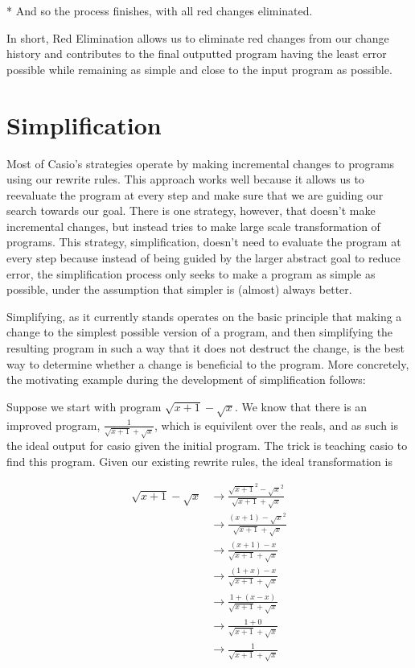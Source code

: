 \documentclass{article}
\newcommand{\sqrsqrt}[1]{\sqrt{#1}^2}
\begin{document}
* And so the process finishes, 
with all red changes eliminated.

In short, 
Red Elimination allows us to eliminate
red changes from our change history 
and contributes to the final outputted 
program having the least error possible 
while remaining as simple 
and close to the input program 
as possible.

\section{Simplification}

Most of Casio's strategies 
operate by making incremental changes 
to programs using our rewrite rules. 
This approach works well 
because it allows us to reevaluate the program 
at every step 
and make sure that we are guiding our search 
towards our goal. 
There is one strategy, however, 
that doesn't make incremental changes, 
but instead tries to make 
large scale transformation of programs. 
This strategy, simplification, 
doesn't need to evaluate 
the program at every step 
because instead of being guided 
by the larger abstract goal 
to reduce error, 
the simplification process only seeks 
to make a program as simple as possible, 
under the assumption that 
simpler is (almost) always better.

Simplifying, 
as it currently stands 
operates on the basic principle 
that making a change to the 
simplest possible version of a program, 
and then simplifying the resulting program 
in such a way that 
it does not destruct the change, 
is the best way to determine 
whether a change is beneficial 
to the program. 
More concretely, 
the motivating example during 
the development of simplification follows:

Suppose we start with program $\sqrt{x+1} - \sqrt{x}$. 
We know that there is an improved program, 
$\frac{1}{\sqrt{x+1} + \sqrt{x}}$, 
which is equivilent over the reals, 
and as such is the ideal output 
for casio given the initial program. 
The trick is teaching casio 
to find this program. 
Given our existing rewrite rules, 
the ideal transformation is 

\begin{align*}
\sqrt{x + 1} - \sqrt{x} &\to \frac{\sqrsqrt{x + 1} - \sqrsqrt{x}}{\sqrt{x + 1} + \sqrt{x}}\\
&\to \frac{(x + 1) - \sqrsqrt{x}}{\sqrt{x + 1} + \sqrt{x}}\\
&\to \frac{(x + 1) - x}{\sqrt{x + 1} + \sqrt{x}}\\
&\to \frac{(1 + x) - x}{\sqrt{x + 1} + \sqrt{x}}\\
&\to \frac{1 + (x - x)}{\sqrt{x + 1} + \sqrt{x}}\\
&\to \frac{1 + 0}{\sqrt{x + 1} + \sqrt{x}}\\
&\to \frac{1}{\sqrt{x + 1} + \sqrt{x}}
\end{align*}
\end{document}

